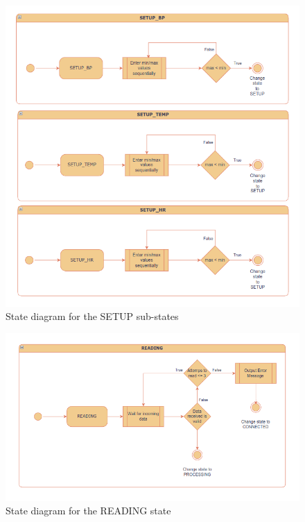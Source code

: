 \begin{figure}[H]
	\centering
	\includegraphics[width=\textwidth]{diagrams/states_setup_substates}
	\caption{State diagram for the SETUP sub-states}
	\label{fig:states_setup_substates}
\end{figure}

\begin{figure}[H]
	\centering
	\includegraphics[width=\textwidth]{diagrams/states_reading}
	\caption{State diagram for the READING state}
	\label{fig:states_reading}
\end{figure}

